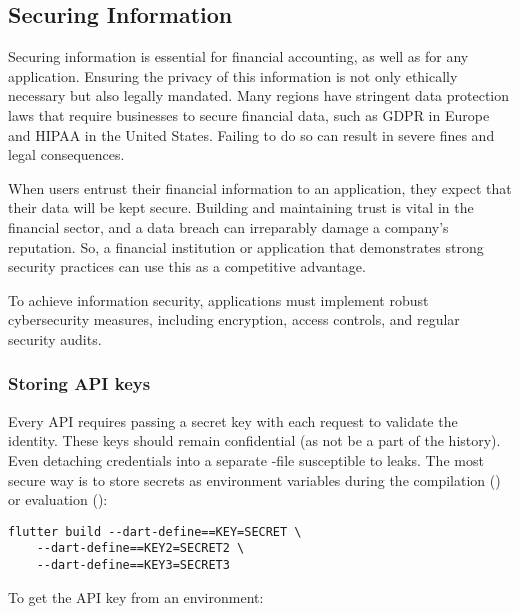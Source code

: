 
\subsection{Securing Information}

Securing information is essential for financial accounting, as well as for any application. Ensuring the privacy 
of this information is not only ethically necessary but also legally mandated. Many regions have stringent data 
protection laws that require businesses to secure financial data, such as GDPR in Europe and HIPAA in the United States.
Failing to do so can result in severe fines and legal consequences.

When users entrust their financial information to an application, they expect that their data will be kept secure. 
Building and maintaining trust is vital in the financial sector, and a data breach can irreparably damage a company's 
reputation. So, a financial institution or application that demonstrates strong security practices can use this as a 
competitive advantage.

To achieve information security, applications must implement robust cybersecurity measures, including encryption, 
access controls, and regular security audits.


\subsubsection{Storing API keys}

Every API requires passing a secret key with each request to validate the identity. These keys should remain 
confidential (as not be a part of the  history). Even detaching credentials into a separate -file  
susceptible to leaks. The most secure way is to store secrets as environment variables during the compilation 
() or evaluation ():

\begin{lstlisting}[language=terminal]
flutter build --dart-define==KEY=SECRET \
    --dart-define==KEY2=SECRET2 \
    --dart-define==KEY3=SECRET3
\end{lstlisting}

\noindent To get the API key from an environment:

